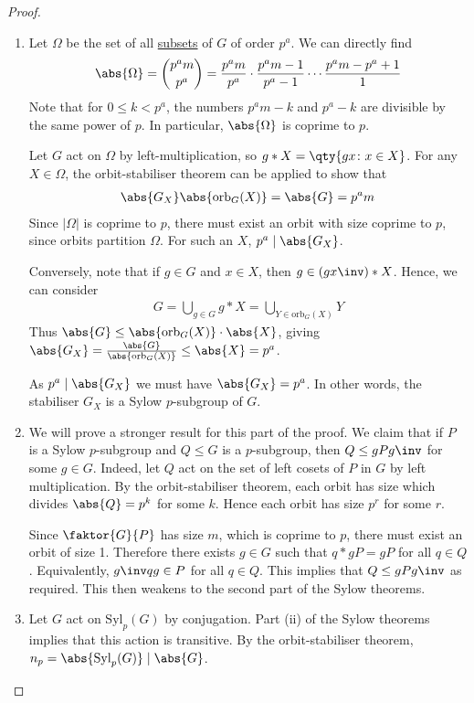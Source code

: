 \begin{proof}
	\begin{enumerate}
		\item Let $\Omega$ be the set of all \underline{subsets} of $G$ of order $p^a$.
		      We can directly find
		      \begin{align*}
			      \abs{\Omega} = \binom{p^a m}{p^a} = \frac{p^a m}{p^a} \cdot \frac{p^a m - 1}{p^a - 1} \cdots \frac{p^a m - p^a + 1}{1}
		      \end{align*}
		      Note that for $0 \leq k < p^a$, the numbers $p^a m - k$ and $p^a - k$ are divisible by the same power of $p$.
		      In particular, $\abs{\Omega}$ is coprime to $p$.

		      Let $G$ act on $\Omega$ by left-multiplication, so $g \ast X = \qty{gx \colon x \in X}$.
		      For any $X \in \Omega$, the orbit-stabiliser theorem can be applied to show that
		      \begin{align*}
			      \abs{G_X} \abs{\mathrm{orb}_G(X)} = \abs{G} = p^a m
		      \end{align*}
		      Since $|\Omega|$ is coprime to $p$, there must exist an orbit with size coprime to $p$, since orbits partition $\Omega$.
		      For such an $X$, $p^a \mid \abs{G_X}$.

		      Conversely, note that if $g \in G$ and $x \in X$, then $g \in (gx\inv) \ast X$.
		      Hence, we can consider
		      \begin{align*}
			      G = \bigcup_{g \in G} g \ast X = \bigcup_{Y \in \mathrm{orb}_G(X)} Y
		      \end{align*}
		      Thus $\abs{G} \leq \abs{\mathrm{orb}_G(X)} \cdot \abs{X}$, giving $\abs{G_X} = \frac{\abs{G}}{\abs{\mathrm{orb}_G(X)}} \leq \abs{X} = p^a$.

		      As $p^a \mid \abs{G_X}$ we must have $\abs{G_X} = p^a$.
		      In other words, the stabiliser $G_X$ is a Sylow $p$-subgroup of $G$.
		\item We will prove a stronger result for this part of the proof.
		      We claim that if $P$ is a Sylow $p$-subgroup and $Q \leq G$ is a $p$-subgroup, then $Q \leq g P g\inv$ for some $g \in G$.
		      Indeed, let $Q$ act on the set of left cosets of $P$ in $G$ by left multiplication.
		      By the orbit-stabiliser theorem, each orbit has size which divides $\abs{Q} = p^k$ for some $k$.
		      Hence each orbit has size $p^r$ for some $r$.

		      Since $\faktor{G}{P}$ has size $m$, which is coprime to $p$, there must exist an orbit of size 1.
		      Therefore there exists $g \in G$ such that $q \ast gP = gP$ for all $q \in Q$.
		      Equivalently, $g\inv q g \in P$ for all $q \in Q$.
		      This implies that $Q \leq gPg\inv$ as required.
		      This then weakens to the second part of the Sylow theorems.
		\item Let $G$ act on $\mathrm{Syl}_p(G)$ by conjugation.
		      Part (ii) of the Sylow theorems implies that this action is transitive.
		      By the orbit-stabiliser theorem, $n_p = \abs{\mathrm{Syl}_p(G)} \mid \abs{G}$.


\end{enumerate}
\end{proof}
